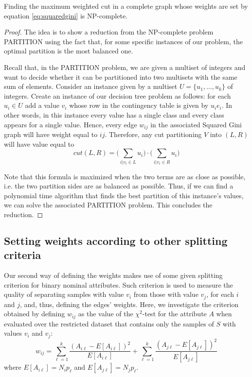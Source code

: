 \begin{theorem}
Finding the maximum weighted cut in a complete graph whose weights are set by equation \ref{eq:squaredgini} is NP-complete.
\end{theorem}

\begin{proof}
 The idea is to show a reduction from the NP-complete problem PARTITION using the fact that, for some specific instances of our problem, the optimal partition is the most balanced one.
 
 Recall that, in the PARTITION problem, we are given a multiset of integers and want to decide whether it can be partitioned into two multisets with the same sum of elements. Consider an instance given by a multiset $U = \{u_1, \ldots, u_k\}$ of integers. Create an instance of our decision tree problem as follows: for each $u_i \in U$ add a value $v_i$ whose row in the contingency table is given by $u_i e_i$. In other words, in this instance every value has a single class and every class appears for a single value. Hence, every edge $w_{ij}$ in the associated Squared Gini graph will have weight equal to $ij$. Therefore, any cut partitioning $V$ into $(L, R)$ will have value equal to
 $$cut(L, R) = \Big(\sum_{i|v_i \in L} u_i\Big) \cdot \Big(\sum_{i|v_i \in R} u_i\Big)$$
 
Note that this formula is maximized when the two terms are as close as possible, i.e. the two partition sides are as balanced as possible. Thus, if we can find a polynomial time algorithm that finds the best partition of this instance's values, we can solve the associated PARTITION problem. This concludes the reduction.
\end{proof}

\subsection{Setting weights according to other splitting criteria}

Our second way of defining the weights makes use of some 
given splitting criterion 
for  binary nominal attributes. 
Such  criterion is used to measure the quality of separating samples with value $v_i$ from those with value $v_j$,
for each $i$ and $j$, and, thus, defining the edges' weights.
Here, we investigate the criterion obtained by 
defining $w_{ij}$ as the value of the $\chi^2$-test
for the attribute $A$ when  evaluated over the restricted dataset 
that contains only the samples of $S$ with values $v_i$ and $v_j$:
$$w_{ij}=  \sum_{\ell=1}^k \frac{(A_{i \ell}-E[A_{i \ell}] )^2}{E[A_{ i \ell}]}
+ \sum_{\ell=1}^k \frac{(A_{j \ell}-E[A_{j \ell}] )^2}{E[A_{ j \ell}]}
$$
where $E[A_{i \ell }]=N_i p_{\ell}$
and $E[A_{j \ell }]=N_j p_{\ell} $.

